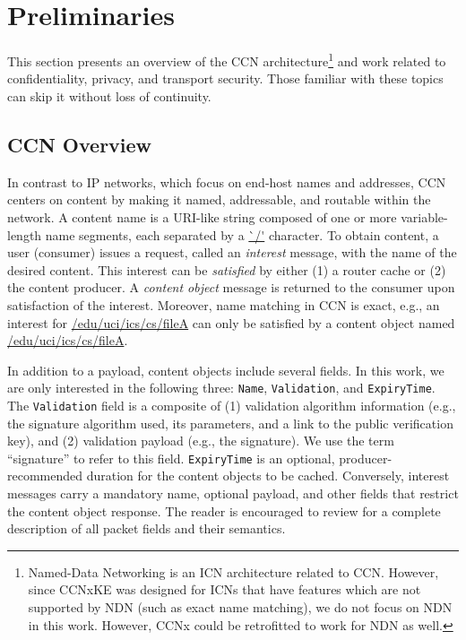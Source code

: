 \section{Preliminaries}
This section presents an overview of the CCN architecture\footnote{Named-Data Networking \cite{jacobson2009networking}
is an ICN architecture related to CCN. However, since CCNxKE was
designed for ICNs that have features which are not supported by NDN (such
as exact name matching), we do not focus on NDN in this work. However,
CCNx could be retrofitted to work for NDN as well.} and work
related to confidentiality, privacy, and transport security. Those familiar with these topics
can skip it without loss of continuity.

\subsection{CCN Overview}
In contrast to IP networks, which focus on end-host names and addresses,
CCN \cite{jacobson2009networking,mosko2016semantics} centers
on content by making it named, addressable, and routable within the network. A
content name is a URI-like string composed of one or more
variable-length name segments, each separated by a \url{`/'} character. To
obtain content, a user (consumer) issues a request, called an \emph{interest}
message, with the name of the desired content. This interest can be
\emph{satisfied} by either (1) a router cache or (2) the content producer. A
\emph{content object} message is returned to the consumer upon satisfaction of
the interest. Moreover, name matching in CCN is exact, e.g., an interest for
\url{/edu/uci/ics/cs/fileA} can only be satisfied by a content object
named \url{/edu/uci/ics/cs/fileA}.

In addition to a payload, content objects include several fields. In this work,
we are only interested in the following three: {\tt Name}, {\tt Validation}, and {\tt ExpiryTime}.
The {\tt Validation} field is a composite of (1) validation algorithm information
(e.g., the signature algorithm used, its parameters, and a link to the public
verification key), and (2) validation payload (e.g., the signature). We use the
term ``signature'' to refer to this field. {\tt ExpiryTime} is an optional,
producer-recommended duration for the content objects to be cached.
Conversely, interest messages carry a mandatory name, optional payload, and
other fields that restrict the content object response. The reader is encouraged
to review \cite{mosko2016semantics} for a complete description of all packet fields
and their semantics.

